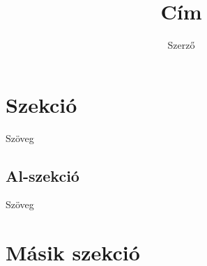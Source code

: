 \documentclass[12pt,a4paper]{article}
\author{ Szerző }
\title{ Cím }
\begin{document}
	\maketitle \pagebreak
	\tableofcontents \pagebreak

\section{Szekció}
Szöveg
	\subsection{Al-szekció}
	Szöveg
\section{ Másik szekció}
	
	
	
\end{document}
